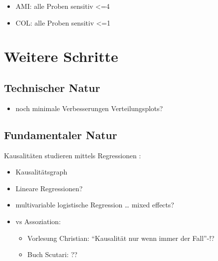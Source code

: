 \documentclass[
]{article}
\providecommand{\tightlist}{%
  \setlength{\itemsep}{0pt}\setlength{\parskip}{0pt}}
\begin{document}
\begin{itemize}
\tightlist
\item
  AMI: alle Proben sensitiv \textless=4
\item
  COL: alle Proben sensitiv \textless=1
\end{itemize}

\hypertarget{weitere-schritte}{%
\section{Weitere Schritte}\label{weitere-schritte}}

\hypertarget{technischer-natur}{%
\subsection{Technischer Natur}\label{technischer-natur}}

\begin{itemize}
\tightlist
\item
  noch minimale Verbesserungen Verteilungsplots?
\end{itemize}

\hypertarget{fundamentaler-natur}{%
\subsection{Fundamentaler Natur}\label{fundamentaler-natur}}

Kausalitäten studieren mittels Regressionen :

\begin{itemize}
\tightlist
\item
  Kausalitätsgraph
\item
  Lineare Regressionen?
\item
  multivariable logistische Regression \ldots{} mixed effects?
\end{itemize}

\newpage

\begin{itemize}
\tightlist
\item
  vs Assoziation:

  \begin{itemize}
  \tightlist
  \item
    Vorlesung Christian: ``Kausalität nur wenn immer der Fall''-!?
  \item
    Buch Scutari: ??
  \end{itemize}
\end{itemize}
\end{document}
